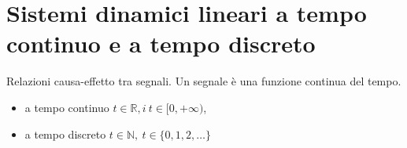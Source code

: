 \documentclass[10pt,a4paper]{book}
\begin{document}
\chapter{Sistemi dinamici lineari a tempo continuo e a tempo discreto}

Relazioni causa-effetto tra segnali. Un segnale è una funzione continua del tempo.
\begin{itemize}
	\item a tempo continuo $t\in \mathbb{R} ,i\ t\in [ 0,+\infty )$,
	\item a tempo discreto $t\in \mathbb{N} ,\ t\in \{0,1,2,\dotsc \}$
\end{itemize}
\end{document}
